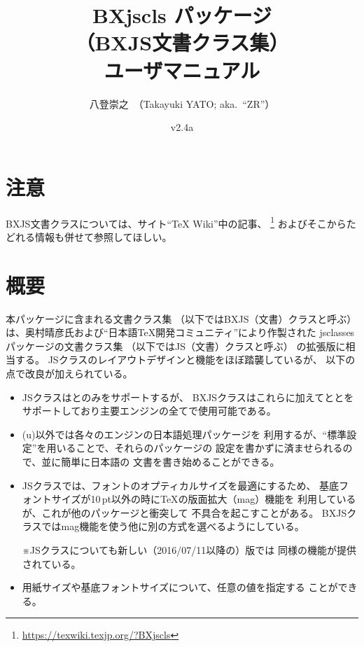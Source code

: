 \documentclass[a4paper]{ltjsarticle}
\newcommand{\PkgVersion}{2.4a}
\newcommand{\PkgDate}{2021/01/27}
\newcommand{\Pkg}[1]{\textsf{#1}}
\newcommand{\Note}{\par\noindent ※}
\newcommand{\jemph}{\textsf}
\begin{document}
\title{\Pkg{BXjscls} パッケージ\\
  （BXJS文書クラス集）\\
  ユーザマニュアル}
\author{八登崇之\ （Takayuki YATO; aka.~``ZR''）}
\date{v\PkgVersion\quad[\PkgDate]}
\maketitle
\tableofcontents

\section*{注意}

BXJS文書クラスについては、サイト“{\TeX} Wiki”中の記事、
\footnote{\url{https://texwiki.texjp.org/?BXjscls}}%
およびそこからたどれる情報も併せて参照してほしい。

\section{概要}
\label{sec:Ovewview}

本パッケージに含まれる文書クラス集
（以下では\jemph{BXJS（文書）クラス}と呼ぶ）
は、奥村晴彦氏および“日本語{\TeX}開発コミュニティ”により作製された
\Pkg{jsclasses}パッケージの文書クラス集
（以下では\jemph{JS（文書）クラス}と呼ぶ）
の拡張版に相当する。
JSクラスのレイアウトデザインと機能をほぼ踏襲しているが、
以下の点で改良が加えられている。
\begin{itemize}
\item JSクラスは{\pLaTeX}と{\upLaTeX}のみをサポートするが、
  BXJSクラスはこれらに加えて{\pdfLaTeX}と{\XeLaTeX}と{\LuaLaTeX}を
  サポートしており主要エンジンの全てで使用可能である。
\item (u){\pLaTeX}以外では各々のエンジンの日本語処理パッケージを
  利用するが、“標準設定”を用いることで、それらのパッケージの
  設定を書かずに済ませられるので、{\pLaTeX}並に簡単に日本語の
  文書を書き始めることができる。
\item JSクラスでは、フォントのオプティカルサイズを最適にするため、
  基底フォントサイズが10\,pt以外の時に{\TeX}の版面拡大（mag）機能を
  利用しているが、これが他のパッケージと衝突して
  不具合を起こすことがある。
  BXJSクラスではmag機能を使う他に別の方式を選べるようにしている。
  \Note JSクラスについても新しい（2016/07/11以降の）版では
  同様の機能が提供されている。
\item 用紙サイズや基底フォントサイズについて、任意の値を指定する
  ことができる。
\end{itemize}
\end{document}
